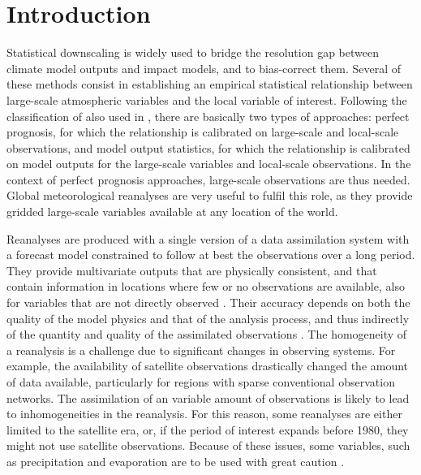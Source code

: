 \documentclass{ametsoc}
\begin{document}



\section{Introduction}

Statistical downscaling is widely used to bridge the resolution gap between climate model outputs and impact models, and to bias-correct them. Several of these methods consist in establishing an empirical statistical relationship between large-scale atmospheric variables and the local variable of interest. Following the classification of \citet{Rummukainen1997} also used in \citet{Maraun2010}, there are basically two types of approaches: perfect prognosis, for which the relationship is calibrated on large-scale and local-scale observations, and model output statistics, for which the relationship is calibrated on model outputs for the large-scale variables and local-scale observations. In the context of perfect prognosis approaches, large-scale observations are thus needed. Global meteorological reanalyses are very useful to fulfil this role, as they provide gridded large-scale variables available at any location of the world.

Reanalyses are produced with a single version of a data assimilation system with a forecast model constrained to follow at best the observations over a long period. They provide multivariate outputs that are physically consistent, and that contain information in locations where few or no observations are available, also for variables that are not directly observed \citep{Gelaro2017}. Their accuracy depends on both the quality of the model physics and that of the analysis process, and thus indirectly of the quantity and quality of the assimilated observations \citep{Dee2011a}. The homogeneity of a reanalysis is a challenge due to significant changes in observing systems. For example, the availability of satellite observations drastically changed the amount of data available, particularly for regions with sparse conventional observation networks. The assimilation of an variable amount of observations is likely to lead to inhomogeneities in the reanalysis. For this reason, some reanalyses are either limited to the satellite era, or, if the period of interest expands before 1980, they might not use satellite observations. Because of these issues, some variables, such as precipitation and evaporation are to be used with great caution \citep{Kobayashi2015}.
\end{document}
